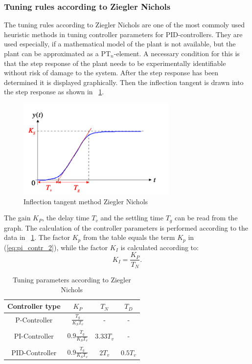 \subsubsection{Tuning rules according to Ziegler Nichols}
The tuning rules according to Ziegler Nichols are one of the most commoly used heuristic methods in tuning controller parameters for PID-controllers. They are used especially, if a mathematical model of the plant is not available, but the plant can be approximated as a PT$_{n}$-element. \cite{Reg_17}
A necessary condition for this is that the step response of the plant needs to be experimentally identifiable without risk of damage to the system. After the step response has been determined it is displayed graphically. Then the inflection tangent is drawn into the step response as shown in \figurename~\ref{fig:param_zn}.
\begin{figure}
   \centering
   \includegraphics[width=0.7\textwidth]{images/param_zn.jpg}
   \caption[Inflection tangent method Ziegler Nichols]{Inflection tangent method Ziegler Nichols}
   \label{fig:param_zn}
 \end{figure}
The gain $K_{P}$, the delay time $T_{v}$ and the settling time $T_{g}$ can be read from the graph.
The calculation of the controller parameters is performed according to the data in \tablename~\ref{tab:param_zn}. The factor $K_{p}$ from the table equals the term $K_{p}$ in (\ref{eq:pi_contr_2}), while the factor $K_{I}$ is calculated according to:
\begin{equation}
    K_{I}  = \frac{K_{P}}{T_{N}}.
 \label{eq:K_I}
\end{equation}
\begin{table}
  \centering
  \begin{tabularx}{0.6\textwidth}{c|c|c|c}
    \toprule
    Controller type & $K_{P}$ &  $T_{N}$ & $T_{D}$   \\
    \midrule
    P-Controller &  $\frac{T_{g}}{K_{S}T_{v}}$ & - & - \\
    & & & \\
    PI-Controller & $0.9\frac{T_{g}}{K_{S}T_{v}}$ & $3.33T_{v}$ & - \\
    & & & \\
    PID-Controller & $0.9\frac{T_{g}}{K_{S}T_{v}}$ & $2T_{v}$ & $0.5T_{v}$ \\
     \bottomrule
  \end{tabularx}
  \caption[Tuning parameters Ziegler Nichols]{Tuning parameters according to Ziegler Nichols}
  \label{tab:param_zn}
\end{table}


